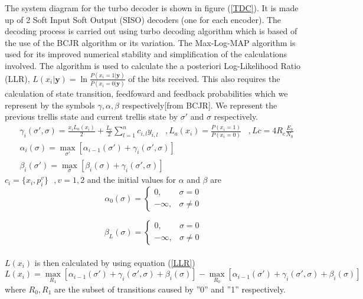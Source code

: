 \documentclass[twocolumn]{article}
\begin{document}
 
 The system diagram for the turbo decoder is shown in figure (\ref{TDC}). It is made up of 2
 Soft Input Soft Output (SISO) decoders (one for each encoder). The decoding 
 process is carried out using turbo decoding algorithm which is based of the use of
 the BCJR algorithm or its variation.  The Max-Log-MAP algorithm is used 
 for its improved numerical stability and simplification of the calculations involved. 
 The algorithm is used to calculate the a posteriori Log-Likelihood Ratio (LLR),  
 $L(x_i|\mathbf{y})=\ln \frac{P(x_i=1|\mathbf{y})}{P(x_i=0|\mathbf{y})}$ 
 of the bits received. This also requires
 the calculation of state transition, feedfoward and feedback probabilities which we
 represent by the symbols $\gamma,\alpha, \beta $ respectively[from BCJR]. We 
 represent the previous trellis state and current trellis state by $\sigma'$ and $\sigma$ 
 respectively.
\begin{equation}
\begin{split}
&\gamma_i(\sigma',\sigma)=
\frac{x_i L_a (x_i)}{2}+
\frac{L_c}{2}\sum_{l=1}^{n} c_{i,l}y_{i,l}\,\,\,\,\, ,L_a(x_i) =\frac{P(x_i=1)}{P(x_i=0)}
\,\,\,\,\, ,Lc=4R_c\frac{E_b}{N_0}\\
&\alpha_i(\sigma)=\max_{\sigma'}[\alpha_{i-1}(\sigma')+\gamma_i(\sigma',\sigma)]\\
&\beta_i(\sigma')=\max_{\sigma}[\beta_{i}(\sigma)+\gamma_i(\sigma',\sigma)]
\end{split}
\label{abc}
\end{equation}
$c_i=\{x_i,p^{v}_i\}\,\,\,\, ,v=1,2$ and the initial values for $\alpha$ and $\beta$ are
\[
    \alpha_0(\sigma)= 
\begin{cases}
   0,& \sigma= 0\\        -\infty,              &  \sigma \neq 0
\end{cases}
\]

\[
   \beta_L(\sigma)= 
\begin{cases}
   0,& \sigma= 0\\        -\infty,              &  \sigma \neq 0
\end{cases}
\]
 \paragraph{}
$ L(x_i)$ is then calculated by using equation (\ref{LLR})
 \begin{equation}
 L(x_i)=\max_{R_1}[\alpha_{i-1}(\sigma')+ \gamma_i(\sigma',\sigma)+\beta_i(\sigma)]
 -
 \max_{R_0}[\alpha_{i-1}(\sigma')+ \gamma_i(\sigma',\sigma)+\beta_i(\sigma)]
\label{LLR}
\end{equation}
where $R_0,R_1$ are the subset of transitions caused by ''0'' and ''1'' respectively.
\end{document}
